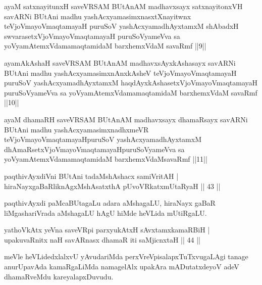 
\begin{kandikeshl}
ayaM satxnayitunxH saveVRSAM BUtAnAM madhavxsayx satxnayitonxVH savARNi BUtAni madhu yashAcxyamasimxnasxtXnayitwnx teVjoVmayoV\s maqtamayaH puruSoV yashAcxyamadhAyxtamxM shAbadxH swvarasetxVjoVmayoV\s maqtamayaH puruSoV\s yameVva sa yoV\s yamAtemxVdamamaqtamidaM barxhemxVdaM savaRmf ||9||
\end{kandikeshl}


\begin{kandikeshl}
ayamAkAshaH saveVRSAM BUtAnAM madhavxsAyxkAshasayx savARNi BUtAni madhu yashAcxyamasimxnAnxkAsheV teVjoVmayoV\s maqtamayaH puruSoV yashAcxyamadhAyxtamxM haqdAyxkAshasetxVjoVmayoV\s maqtamayaH puruSoV\s\break yameVva sa yoV\s yamAtemxVdamamaqtamidaM barxhemxVdaM savaRmf ||10||
\end{kandikeshl}


\begin{kandikeshl}
ayaM dhamaRH saveVRSAM BUtAnAM madhavxsayx dhamaRsayx savARNi BUtAni madhu yashAcxyamasimxnadhxmeVR teVjoVmayoV\s maqtamayaH\break puruSoV yashAcxyamadhAyxtamxM dhAmaRsetxVjoVmayoV\s maqtamayaH\break puruSoV\s yameVva sa yoV\s yamAtemxVdamamaqtamidaM barxhemxVdaM\break savaRmf ||11||
\end{kandikeshl}


\begin{shl}
paqthivAyxdiVni BUtAni tadaMshAshacx samiVritAH |\\
hiraNayxgaBaRliknAgxMshAsatxthA pUvoVRkatxmUtaRyaH \hfill || 43 ||
\end{shl}

\begin{artha}
paqthivAyxdi paMcaBUtagaLu adara aMshagaLU, hiraNayx gaBaR liMgashariVrada aMshagaLU hAgU hiMde heVLida mUtiRgaLU.
\end{artha}

\begin{shl}
yathoVkAtx yeVna saveVR\s pi parxyukAtxH sAvxtamxkamaRBiH |\\
upakuvaRnitx naH savARnasx dhamaR iti saMjicnxtaH \hfill || 44 ||
\end{shl}

\begin{artha}
meVle heVLidedxlalxvU yAvudariMda perxVreVpisalapxTuTxvugaLAgi tanage anurUpavAda kamaRgaLiMda namagelAlx upakAra mADutatxdeyoV adeV dhamaRveMdu kareyalapxDuvudu.
\end{artha}

